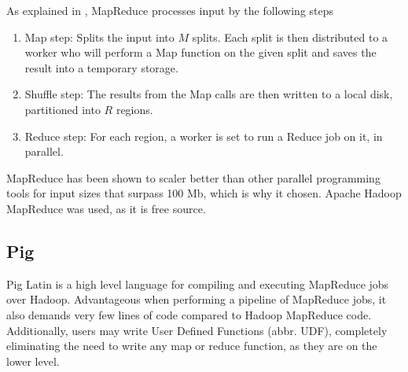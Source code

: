 \documentclass[../../main.tex]{subfiles}
\begin{document}
 As explained in \cite{mapreduceExplained}, MapReduce processes input by the following steps
\begin{enumerate}
\item Map step: Splits the input into $M$ splits. Each split is then distributed to a worker who will perform a Map function on the given split and saves the result into a temporary storage.
\item Shuffle step: The results from the Map calls are then written to a local disk, partitioned into $R$ regions.
\item Reduce step: For each region, a worker is set to run a Reduce job on it, in parallel.
\end{enumerate}

MapReduce has been shown to scaler better than other parallel programming tools for input sizes that surpass 100 Mb, which is why it chosen.\cite{compForkMapRed} Apache Hadoop MapReduce was used, as it is free source.

\subsection{Pig}
Pig Latin is a high level language for compiling and executing MapReduce jobs over Hadoop. Advantageous when performing a pipeline of MapReduce jobs\cite{pig}, it also demands very few lines of code compared to Hadoop MapReduce code. Additionally, users may write User Defined Functions (abbr. UDF), completely eliminating the need to write any map or reduce function, as they are on the lower level.


 
\end{document}
